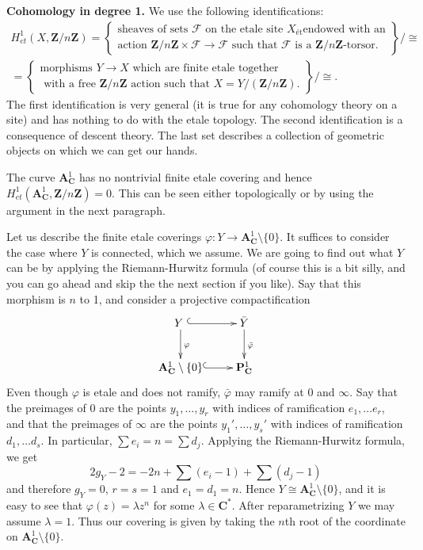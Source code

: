 \medskip\noindent
{\bf Cohomology in degree 1.} We use the following identifications:
\begin{eqnarray*}
H_{et}^1 (X, \mathbf{Z}/n\mathbf{Z}) = \left\{
\begin{matrix}
\text{sheaves of sets $\mathcal{F}$ on the etale site $X_{\text{\'et}}$
endowed with an} \\
\text{action $\mathbf{Z}/n\mathbf{Z} \times \mathcal{F} \to \mathcal{F}$ such
that $\mathcal{F}$ is a $\mathbf{Z}/n\mathbf{Z}$-torsor.}
\end{matrix}
\right\}
\Big/ \cong
\\
 = \left\{
\begin{matrix}
\text{morphisms $Y \to X$ which are finite etale together} \\
\text{ with a free $\mathbf{Z}/n\mathbf{Z}$ action such that $X = Y
/(\mathbf{Z}/n\mathbf{Z})$.}
\end{matrix}
\right\}
\Big/ \cong.
\end{eqnarray*}
The first identification is very general (it is true for any cohomology theory
on a site) and has nothing to do with the etale topology. The second
identification is a consequence of descent theory. The last set describes a
collection of geometric objects on which we can get our hands.

\medskip\noindent
The curve $\mathbf{A}^1_\mathbf{C}$ has no nontrivial finite etale covering
and hence $H_{et}^1 (\mathbf{A}^1_\mathbf{C}, \mathbf{Z}/n\mathbf{Z}) = 0$.
This can be seen either topologically or by using the argument in the next
paragraph.

\medskip\noindent
Let us describe the finite etale coverings
$\varphi: Y \to \mathbf{A}^1_\mathbf{C} \setminus \{0\}$.
It suffices to consider the case where $Y$ is
connected, which we assume. We are going to find out what $Y$ can be
by applying the Riemann-Hurwitz formula (of course this is a bit silly, and
you can go ahead and skip the the next section if you like).
Say that this morphism is $n$ to 1, and consider a
projective compactification
$$
\xymatrix{
{Y\ } \ar@{^{(}->}[r] \ar^{\varphi}[d] &
{\bar Y} \ar^{\bar\varphi}[d] \\
{\mathbf{A}^1_\mathbf{C} \setminus \{0\}} \ar@{^{(}->}[r] &
{\mathbf{P}^1_\mathbf{C}}
}
$$
Even though $\varphi$ is etale and does not ramify, $\bar{\varphi}$ may
ramify at 0 and $\infty$. Say that the preimages of 0 are the points $y_1,
\dots, y_r$ with indices of ramification $e_1, \dots e_r$, and that the
preimages of $\infty$ are the points $y_1', \dots, y_s'$ with indices of
ramification $d_1, \dots d_s$. In particular, $\sum e_i = n = \sum d_j$.
Applying the Riemann-Hurwitz formula, we get
$$
2 g_Y - 2 = -2n + \sum (e_i - 1) + \sum (d_j - 1)
$$
and therefore $g_Y = 0$, $r=s=1$ and $e_1 = d_1 = n$.
Hence $Y \cong {\mathbf{A}^1_\mathbf{C} \setminus \{0\}}$, and it is easy to
see that $\varphi(z) = \lambda z^n$ for some $\lambda \in \mathbf{C}^*$.
After reparametrizing $Y$ we may assume $\lambda = 1$. Thus our
covering is given by taking the $n$th root of the coordinate on
$\mathbf{A}^1_{\mathbf{C}} \setminus \{0\}$.

